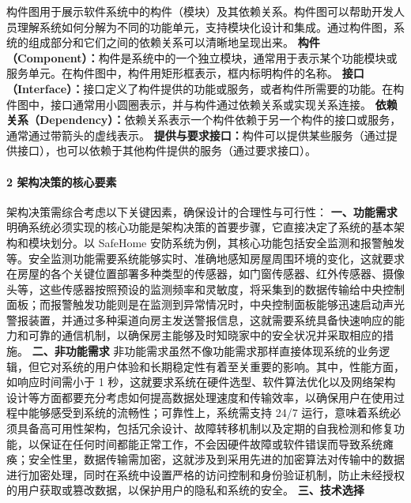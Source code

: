 构件图用于展示软件系统中的构件（模块）及其依赖关系。构件图可以帮助开发人员理解系统如何分解为不同的功能单元，支持模块化设计和集成。通过构件图，系统的组成部分和它们之间的依赖关系可以清晰地呈现出来。 \textbf{构件（Component）：}构件是系统中的一个独立模块，通常用于表示某个功能模块或服务单元。在构件图中，构件用矩形框表示，框内标明构件的名称。 \textbf{接口（Interface）：}接口定义了构件提供的功能或服务，或者构件所需要的功能。在构件图中，接口通常用小圆圈表示，并与构件通过依赖关系或实现关系连接。 \textbf{依赖关系（Dependency）：}依赖关系表示一个构件依赖于另一个构件的接口或服务，通常通过带箭头的虚线表示。 \textbf{提供与要求接口：}构件可以提供某些服务（通过提供接口），也可以依赖于其他构件提供的服务（通过要求接口）。 \paragraph{2 架构决策的核心要素}\label{ux67b6ux6784ux51b3ux7b56ux7684ux6838ux5fc3ux8981ux7d20} 架构决策需综合考虑以下关键因素，确保设计的合理性与可行性： \textbf{一、功能需求} 明确系统必须实现的核心功能是架构决策的首要步骤，它直接决定了系统的基本架构和模块划分。以 SafeHome 安防系统为例，其核心功能包括安全监测和报警触发等。安全监测功能需要系统能够实时、准确地感知房屋周围环境的变化，这就要求在房屋的各个关键位置部署多种类型的传感器，如门窗传感器、红外传感器、摄像头等，这些传感器按照预设的监测频率和灵敏度，将采集到的数据传输给中央控制面板；而报警触发功能则是在监测到异常情况时，中央控制面板能够迅速启动声光警报装置，并通过多种渠道向房主发送警报信息，这就需要系统具备快速响应的能力和可靠的通信机制，以确保房主能够及时知晓家中的安全状况并采取相应的措施。 \textbf{二、非功能需求} 非功能需求虽然不像功能需求那样直接体现系统的业务逻辑，但它对系统的用户体验和长期稳定性有着至关重要的影响。其中，性能方面，如响应时间需小于 1 秒，这就要求系统在硬件选型、软件算法优化以及网络架构设计等方面都要充分考虑如何提高数据处理速度和传输效率，以确保用户在使用过程中能够感受到系统的流畅性；可靠性上，系统需支持 24/7 运行，意味着系统必须具备高可用性架构，包括冗余设计、故障转移机制以及定期的自我检测和修复功能，以保证在任何时间都能正常工作，不会因硬件故障或软件错误而导致系统瘫痪；安全性里，数据传输需加密，这就涉及到采用先进的加密算法对传输中的数据进行加密处理，同时在系统中设置严格的访问控制和身份验证机制，防止未经授权的用户获取或篡改数据，以保护用户的隐私和系统的安全。 \textbf{三、技术选择} 